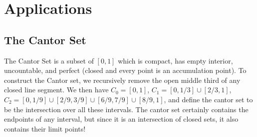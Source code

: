 \documentclass[12pt, a4paper]{book}
\theoremstyle{nonumberplain}
\begin{document}
\section{Applications}
\subsection{The Cantor Set}\label{cantor}
The Cantor Set is a subset of $[0,1]$ which is compact, has empty interior, uncountable, and perfect (closed and every point
is an accumulation point). To construct the Cantor set, we recursively remove the open middle third of any closed line segment.
We then have $C_0=[0,1]$, $C_1=[0,1/3]\cup[2/3,1]$, $C_2=[0,1/9]\cup[2/9,3/9]\cup[6/9,7/9]\cup[8/9,1]$, and define the cantor
set to be the intersection over all these intervals. The cantor set certainly contains the endpoints of any interval, but
since it is an intersection of closed sets, it also contains their limit points!
\end{document}
